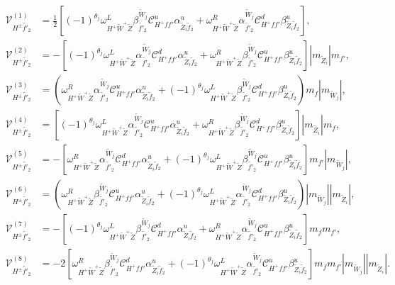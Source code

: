 \documentclass[final,3p,times]{elsarticle}
\begin{document}
\begin{align}
\mathcal{V}_{H^{\pm} \tilde{f'}_2}^{(1)} &	= \frac{1}{2}[(-1)^{\theta_j}\omega_{H^+ \tilde{W}^+ \tilde{Z}}^L \beta_{\tilde{f'}_2}^{\tilde{W}_j} \mathcal{C}_{H^+ f f'}^u \alpha_{\tilde{Z}_i \tilde{f}_2}^{u} + \omega_{H^+ \tilde{W}^+ \tilde{Z}}^R \alpha_{\tilde{f'}_2}^{\tilde{W}_j} \mathcal{C}_{H^+ f f'}^d \beta_{\tilde{Z}_i \tilde{f}_2}^{u}], \\
\mathcal{V}_{H^{\pm} \tilde{f'}_2}^{(2)} &= -[(-1)^{\theta_j}\omega_{H^+ \tilde{W}^+ \tilde{Z}}^L \alpha_{\tilde{f'}_2}^{\tilde{W}_j} \mathcal{C}_{H^+ f f'}^d \alpha_{\tilde{Z}_i \tilde{f}_2}^{u} + \omega_{H^+ \tilde{W}^+ \tilde{Z}}^R \beta_{\tilde{f'}_2}^{\tilde{W}_j} \mathcal{C}_{H^+ f f'}^u \beta_{\tilde{Z}_i \tilde{f}_2}^{u}]|m_{\tilde{Z}_i}|m_{f'}, \\
\mathcal{V}_{H^{\pm} \tilde{f'}_2}^{(3)} &= (\omega_{H^+ \tilde{W}^+ \tilde{Z}}^R \alpha_{\tilde{f'}_2}^{\tilde{W}_j} \mathcal{C}_{H^+ f f'}^u \alpha_{\tilde{Z}_i \tilde{f}_2}^{u} +  (-1)^{\theta_j} \omega_{H^+ \tilde{W}^+ \tilde{Z}}^L \beta_{\tilde{f'}_2}^{\tilde{W}_j} \mathcal{C}_{H^+ f f'}^d \beta_{\tilde{Z}_i \tilde{f}_2}^{u})m_{f}|m_{\tilde{W}_j}|, \\
\mathcal{V}_{H^{\pm} \tilde{f'}_2}^{(4)} &= [(-1)^{\theta_j}\omega_{H^+ \tilde{W}^+ \tilde{Z}}^L \alpha_{\tilde{f'}_2}^{\tilde{W}_j} \mathcal{C}_{H^+ f f'}^u \alpha_{\tilde{Z}_i \tilde{f}_2}^{u} + \omega_{H^+ \tilde{W}^+ \tilde{Z}}^R \beta_{\tilde{f'}_2}^{\tilde{W}_j} \mathcal{C}_{H^+ f f'}^d \beta_{\tilde{Z}_i \tilde{f}_2}^{u}]|m_{\tilde{Z}_i}|m_{f}, \\
\mathcal{V}_{H^{\pm} \tilde{f'}_2}^{(5)} &= -[\omega_{H^+ \tilde{W}^+ \tilde{Z}}^R \alpha_{\tilde{f'}_2}^{\tilde{W}_j} \mathcal{C}_{H^+ f f'}^d \alpha_{\tilde{Z}_i \tilde{f}_2}^{u} + (-1)^{\theta_j} \omega_{H^+ \tilde{W}^+ \tilde{Z}}^L \beta_{\tilde{f'}_2}^{\tilde{W}_j} \mathcal{C}_{H^+ f f'}^u \beta_{\tilde{Z}_i \tilde{f}_2}^{u}]m_{f'}|m_{\tilde{W}_j}|, \\
\mathcal{V}_{H^{\pm} \tilde{f'}_2}^{(6)} &= (\omega_{H^+ \tilde{W}^+ \tilde{Z}}^R \beta_{\tilde{f'}_2}^{\tilde{W}_j} \mathcal{C}_{H^+ f f'}^u \alpha_{\tilde{Z}_i \tilde{f}_2}^{u} + (-1)^{\theta_j} \omega_{H^+ \tilde{W}^+ \tilde{Z}}^L \alpha_{\tilde{f'}_2}^{\tilde{W}_j} \mathcal{C}_{H^+ f f'}^d \beta_{\tilde{Z}_i \tilde{f}_2}^{u})|m_{\tilde{W}_j}||m_{\tilde{Z}_i}|, \\
\mathcal{V}_{H^{\pm} \tilde{f'}_2}^{(7)} &= -[(-1)^{\theta_j}\omega_{H^+ \tilde{W}^+ \tilde{Z}}^L \beta_{\tilde{f'}_2}^{\tilde{W}_j} \mathcal{C}_{H^+ f f'}^d \alpha_{\tilde{Z}_i \tilde{f}_2}^{u} + \omega_{H^+ \tilde{W}^+ \tilde{Z}}^R \alpha_{\tilde{f'}_2}^{\tilde{W}_j} \mathcal{C}_{H^+ f f'}^u \beta_{\tilde{Z}_i \tilde{f}_2}^{u}]m_{f}m_{f'}, \\
\mathcal{V}_{H^{\pm} \tilde{f'}_2}^{(8)} &= -2[\omega_{H^+ \tilde{W}^+ \tilde{Z}}^R \beta_{\tilde{f'}_2}^{\tilde{W}_j}  \mathcal{C}_{H^+ f f'}^d \alpha_{\tilde{Z}_i \tilde{f}_2}^{u} + (-1)^{\theta_j}\omega_{H^+ \tilde{W}^+ \tilde{Z}}^L \alpha_{\tilde{f'}_2}^{\tilde{W}_j} \mathcal{C}_{H^+ f f'}^u \beta_{\tilde{Z}_i \tilde{f}_2}^{u}]m_{f}m_{f'}|m_{\tilde{W}_j}||m_{\tilde{Z}_i}|.
\end{align}
\end{document}
